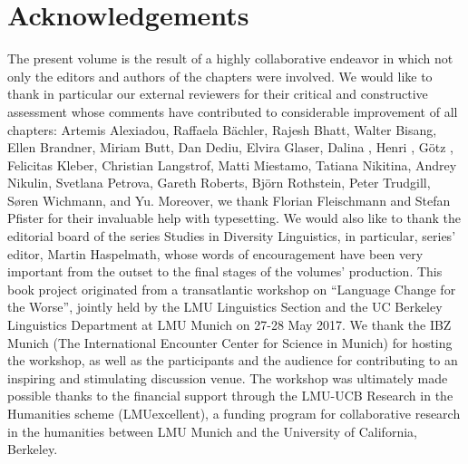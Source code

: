 \documentclass[output=paper,colorlinks,citecolor=brown]{langscibook}
\begin{document}
\section*{Acknowledgements}


The present volume is the result of a highly collaborative endeavor in which not only the editors and authors of the chapters were involved. We would like to thank in particular our external reviewers for their critical and constructive assessment whose comments have contributed to considerable improvement of all chapters: Artemis Alexiadou, Raffaela Bächler, Rajesh Bhatt, Walter Bisang, Ellen Brandner, Miriam Butt, Dan Dediu, Elvira Glaser, Dalina , Henri , Götz , Felicitas Kleber, Christian Langstrof, Matti Miestamo, Tatiana Nikitina, Andrey Nikulin, Svetlana Petrova, Gareth Roberts, Björn Rothstein, Peter Trudgill, Søren Wichmann, and  Yu. Moreover, we thank Florian Fleischmann and Stefan Pfister for their invaluable help with typesetting. We would also like to thank the editorial board of the series Studies in Diversity Linguistics, in particular, series’ editor, Martin Haspelmath, whose words of encouragement have been very important from the outset to the final stages of the volumes’ production. This book project originated from a transatlantic workshop on ``Language Change for the Worse'', jointly held by the LMU  Linguistics Section and the UC Berkeley Linguistics Department at LMU Munich on 27-28 May 2017. We thank the IBZ Munich (The International Encounter Center for Science in Munich) for hosting the workshop, as well as the participants and the audience for contributing to an inspiring and stimulating discussion venue. The workshop was ultimately made possible thanks to the financial support through the LMU-UCB Research in the Humanities scheme (LMUexcellent), a funding program for collaborative research in the humanities between LMU Munich and the University of California, Berkeley.

\printbibliography[heading=subbibliography,notkeyword=this]
\end{document}
